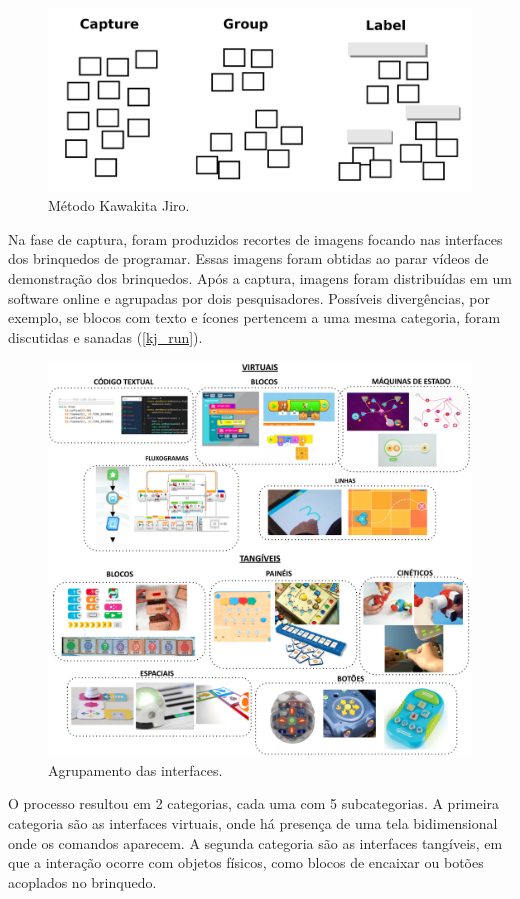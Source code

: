 {\begin{figure}[!htbp]
    \centering
    \includegraphics[width=.6\linewidth,fbox]{figs/kj.png}
    \caption{Método Kawakita Jiro.}
    \label{kj}
    \sourceauthor
\end{figure}
Na fase de captura, foram produzidos recortes de imagens focando nas interfaces dos brinquedos de programar. Essas imagens foram obtidas ao parar vídeos de demonstração dos brinquedos. Após a captura, imagens foram distribuídas em um software online e agrupadas por dois pesquisadores. Possíveis divergências, por exemplo, se blocos com texto e ícones pertencem a uma mesma categoria, foram discutidas e sanadas (\autoref{kj_run}).

\begin{figure}
    \centering
    \includegraphics[width=1\linewidth,fbox]{figs/toys_interfaces.png}
    \caption{Agrupamento das interfaces.}
    \label{kj_run}
\end{figure}

O processo resultou em 2 categorias, cada uma com 5 subcategorias. A primeira categoria são as interfaces virtuais, onde há presença de uma tela bidimensional onde os comandos aparecem. A segunda categoria são as interfaces tangíveis, em que a interação ocorre com objetos físicos, como blocos de encaixar ou botões acoplados no brinquedo.

}
